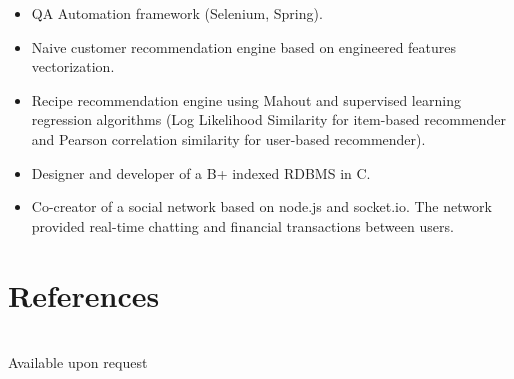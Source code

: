\documentclass{article}
\begin{document}
\begin{multicols}{2}
\begin{itemize}
				\item QA Automation framework (Selenium, Spring).
				\item Naive customer recommendation engine based on engineered features vectorization.
				\item Recipe recommendation engine using Mahout and supervised learning regression algorithms (Log Likelihood Similarity for item-based recommender and Pearson correlation similarity for user-based recommender).
				\item Designer and developer of a B+ indexed RDBMS in C.
				\item Co-creator of a social network based on node.js and socket.io. The network provided real-time chatting and financial transactions between users.
				
				
				
			\end{itemize}
	\end{multicols}

	\section*{\color{NavyBlue}References}
	\vspace{-0.5cm}
	{\color{NavyBlue}\hrulefill} \\
	Available upon request
\end{document}

